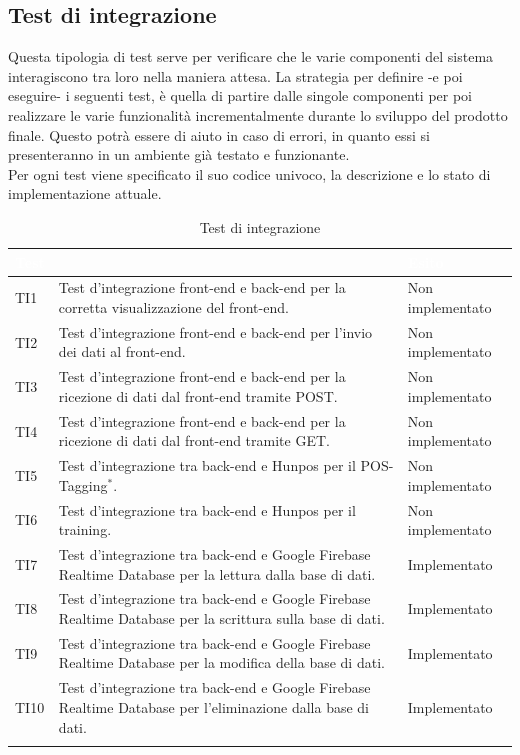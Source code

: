 \subsection{Test di integrazione}
Questa tipologia di test serve per verificare che le varie componenti del sistema interagiscono tra loro nella maniera attesa. La strategia per definire -e poi eseguire- i seguenti test, è quella di partire dalle singole componenti per poi realizzare le varie funzionalità incrementalmente durante lo sviluppo del prodotto finale. Questo potrà essere di aiuto in caso di errori, in quanto essi si presenteranno in un ambiente già testato e funzionante. \\
Per ogni test viene specificato il suo codice univoco, la descrizione e lo stato di implementazione attuale.

	\begin{longtable}{|>{\centering\arraybackslash}m{1.6cm}|>{\centering\arraybackslash}m{6.41cm}|>{\centering\arraybackslash}m{3.1cm}|}		
		\rowcolor{LightBlue}
		\textbf{\textcolor{white}{Test}}
		& \multicolumn{1}{|c|}{\textbf{\textcolor{white}{ Descrizione}}}
		& \textbf{\textcolor{white}{Esito}}\\
		\hline
		TI1
		& Test d’integrazione front-end e back-end per la corretta visualizzazione del front-end.
		& Non implementato
		\\ \hline
		\rowcolor{LightGray}
		TI2
		& Test d’integrazione front-end e back-end per l'invio dei dati al front-end.
		& Non implementato
		\\ \hline
		TI3
		& Test d’integrazione front-end e back-end per la ricezione di dati dal front-end tramite POST.
		& Non implementato
		\\ \hline
		\rowcolor{LightGray}
		TI4
		& Test d’integrazione front-end e back-end per la ricezione di dati dal front-end tramite GET.
		& Non implementato
		\\ \hline
		TI5
		& Test d’integrazione tra back-end e Hunpos per il POS-Tagging$^*$.
		& Non implementato
		\\ \hline
		\rowcolor{LightGray}
		TI6
		& Test d’integrazione tra back-end e Hunpos per il training.
		& Non implementato
		\\ \hline	
		TI7
		& Test d’integrazione tra back-end e Google Firebase Realtime Database per la lettura dalla base di dati.
		& Implementato
		\\ \hline	
		\rowcolor{LightGray}
		TI8
		& Test d’integrazione tra back-end e Google Firebase Realtime Database per la scrittura sulla base di dati.
		& Implementato
		\\ \hline	
		TI9
		& Test d’integrazione tra back-end e Google Firebase Realtime Database per la modifica della base di dati.
		& Implementato
		\\ \hline	
		\rowcolor{LightGray}
		TI10
		& Test d’integrazione tra back-end e Google Firebase Realtime Database per l'eliminazione dalla base di dati.
		& Implementato
		\\ \hline	
		\caption{Test di integrazione}
\end{longtable}


